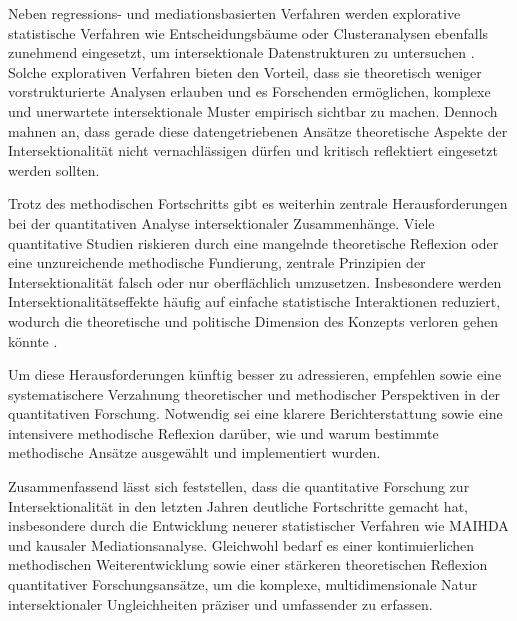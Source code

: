 Neben regressions- und mediationsbasierten Verfahren werden explorative statistische Verfahren wie Entscheidungsbäume oder Clusteranalysen ebenfalls zunehmend eingesetzt, um intersektionale Datenstrukturen zu untersuchen \parencite{bauerIntersectionalityQuantitativeResearch2021}. Solche explorativen Verfahren bieten den Vorteil, dass sie theoretisch weniger vorstrukturierte Analysen erlauben und es Forschenden ermöglichen, komplexe und unerwartete intersektionale Muster empirisch sichtbar zu machen. Dennoch mahnen \textcite{bauerIntersectionalityQuantitativeResearch2021} an, dass gerade diese datengetriebenen Ansätze theoretische Aspekte der Intersektionalität nicht vernachlässigen dürfen und kritisch reflektiert eingesetzt werden sollten.

Trotz des methodischen Fortschritts gibt es weiterhin zentrale Herausforderungen bei der quantitativen Analyse intersektionaler Zusammenhänge. Viele quantitative Studien riskieren durch eine mangelnde theoretische Reflexion oder eine unzureichende methodische Fundierung, zentrale Prinzipien der Intersektionalität falsch oder nur oberflächlich umzusetzen. Insbesondere werden Intersektionalitätseffekte häufig auf einfache statistische Interaktionen reduziert, wodurch die theoretische und politische Dimension des Konzepts verloren gehen könnte \parencite{bowlegInvitedReflectionQuantifying2016,bauerIntersectionalityQuantitativeResearch2021}.

Um diese Herausforderungen künftig besser zu adressieren, empfehlen \textcite{bauerIntersectionalityQuantitativeResearch2021} sowie \textcite{bauerAdvancingQuantitativeIntersectionality2019} eine systematischere Verzahnung theoretischer und methodischer Perspektiven in der quantitativen Forschung. Notwendig sei eine klarere Berichterstattung sowie eine intensivere methodische Reflexion darüber, wie und warum bestimmte methodische Ansätze ausgewählt und implementiert wurden.

Zusammenfassend lässt sich feststellen, dass die quantitative Forschung zur Intersektionalität in den letzten Jahren deutliche Fortschritte gemacht hat, insbesondere durch die Entwicklung neuerer statistischer Verfahren wie MAIHDA und kausaler Mediationsanalyse. Gleichwohl bedarf es einer kontinuierlichen methodischen Weiterentwicklung sowie einer stärkeren theoretischen Reflexion quantitativer Forschungsansätze, um die komplexe, multidimensionale Natur intersektionaler Ungleichheiten präziser und umfassender zu erfassen.
